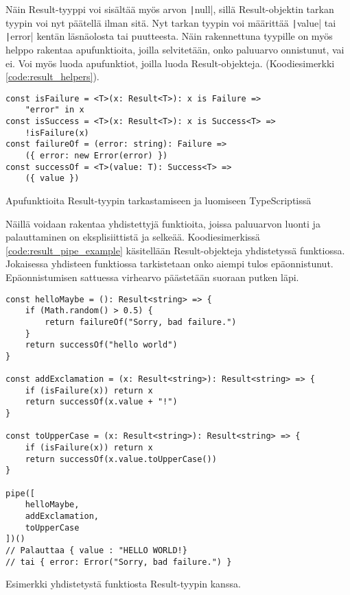 Näin Result-tyyppi voi sisältää myös arvon \texttt|null|, sillä Result-objektin tarkan tyypin voi nyt päätellä ilman sitä. Nyt tarkan tyypin voi määrittää \texttt|value| tai \texttt|error| kentän läsnäolosta tai puutteesta. Näin rakennettuna tyypille on myös helppo rakentaa apufunktioita, joilla selvitetään, onko paluuarvo onnistunut, vai ei. Voi myös luoda apufunktiot, joilla luoda Result-objekteja. (Koodiesimerkki \ref{code:result_helpers}).

\begin{code}
    \begin{verbatim}
const isFailure = <T>(x: Result<T>): x is Failure => 
    "error" in x
const isSuccess = <T>(x: Result<T>): x is Success<T> => 
    !isFailure(x)
const failureOf = (error: string): Failure => 
    ({ error: new Error(error) })
const successOf = <T>(value: T): Success<T> => 
    ({ value })
    \end{verbatim}
    \caption{Apufunktioita Result-tyypin tarkastamiseen ja luomiseen TypeScriptissä}
    \label{code:result_helpers}
\end{code}

Näillä voidaan rakentaa yhdistettyjä funktioita, joissa paluuarvon luonti ja palauttaminen on eksplisiittistä ja selkeää. Koodiesimerkissä \ref{code:result_pipe_example} käsitellään Result-objekteja yhdistetyssä funktiossa. Jokaisessa yhdisteen funktiossa tarkistetaan onko aiempi tulos epäonnistunut. Epäonnistumisen sattuessa virhearvo päästetään suoraan putken läpi.

\begin{code}
    \begin{verbatim}
const helloMaybe = (): Result<string> => {
    if (Math.random() > 0.5) {
        return failureOf("Sorry, bad failure.")
    }
    return successOf("hello world")
}

const addExclamation = (x: Result<string>): Result<string> => {
    if (isFailure(x)) return x
    return successOf(x.value + "!")
}

const toUpperCase = (x: Result<string>): Result<string> => {
    if (isFailure(x)) return x
    return successOf(x.value.toUpperCase())
}

pipe([
    helloMaybe,
    addExclamation,
    toUpperCase
])()
// Palauttaa { value : "HELLO WORLD!}
// tai { error: Error("Sorry, bad failure.") }
    \end{verbatim}
    \caption{Esimerkki yhdistetystä funktiosta Result-tyypin kanssa.}
    \label{code:result_pipe_example}
\end{code}

